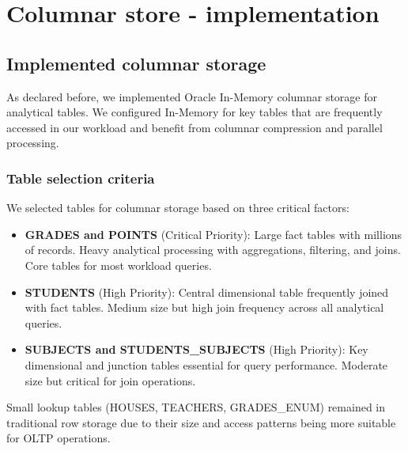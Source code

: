 \section{Columnar store - implementation}

\subsection{Implemented columnar storage}

As declared before, we implemented Oracle In-Memory columnar storage for analytical tables. We configured In-Memory for key tables that are frequently accessed in our workload and benefit from columnar compression and parallel processing.

\subsubsection{Table selection criteria}
We selected tables for columnar storage based on three critical factors:
\begin{itemize}
    \item \textbf{GRADES and POINTS} (Critical Priority): Large fact tables with millions of records. Heavy analytical processing with aggregations, filtering, and joins. Core tables for most workload queries.
    \item \textbf{STUDENTS} (High Priority): Central dimensional table frequently joined with fact tables. Medium size but high join frequency across all analytical queries.
    \item \textbf{SUBJECTS and STUDENTS\_SUBJECTS} (High Priority): Key dimensional and junction tables essential for query performance. Moderate size but critical for join operations.
\end{itemize}

Small lookup tables (HOUSES, TEACHERS, GRADES\_ENUM) remained in traditional row storage due to their size and access patterns being more suitable for OLTP operations.

